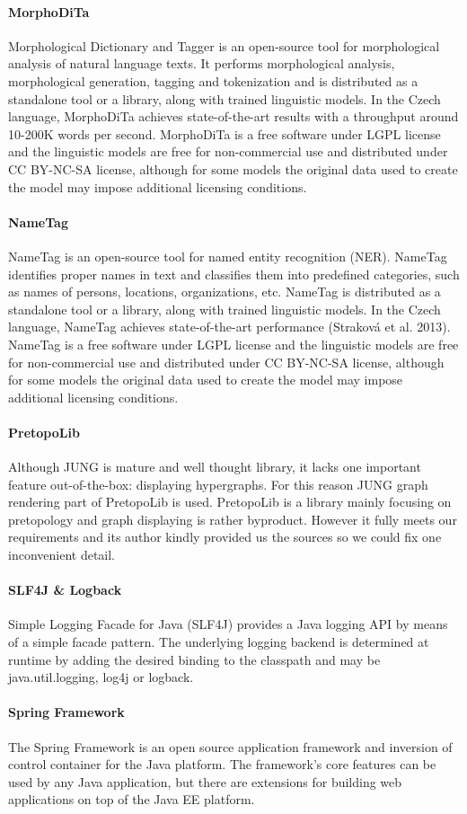 \paragraph{MorphoDiTa}
Morphological Dictionary and Tagger is an open-source tool for morphological
analysis of natural language texts. It performs morphological analysis, 
morphological generation, tagging and tokenization and is distributed as
a standalone tool or a library, along with trained linguistic models. In
the Czech language, MorphoDiTa achieves state-of-the-art results with 
a throughput around 10-200K words per second. MorphoDiTa is a free software
under LGPL license and the linguistic models are free for non-commercial use
and distributed under CC BY-NC-SA license, although for some models the original
data used to create the model may impose additional licensing conditions.

\paragraph{NameTag}
NameTag is an open-source tool for named entity recognition (NER). NameTag 
identifies proper names in text and classifies them into predefined categories,
such as names of persons, locations, organizations, etc. NameTag is distributed
as a standalone tool or a library, along with trained linguistic models.
In the Czech language, NameTag achieves state-of-the-art performance
(Straková et al. 2013). NameTag is a free software under LGPL license and the 
linguistic models are free for non-commercial use and distributed under CC 
BY-NC-SA license, although for some models the original data used to create
the model may impose additional licensing conditions.

\paragraph{PretopoLib}
Although JUNG is mature and well thought library, it lacks one important feature
out-of-the-box: displaying hypergraphs. For this reason JUNG graph rendering
part of PretopoLib is used. PretopoLib is a library mainly focusing on
pretopology and graph displaying is rather byproduct. However it fully meets our
requirements and its author kindly provided us the sources so we could fix one
inconvenient detail.

\paragraph{SLF4J \& Logback}
Simple Logging Facade for Java (SLF4J) provides a Java logging API by means
of a simple facade pattern. The underlying logging backend is determined
at runtime by adding the desired binding to the classpath and may be
java.util.logging, log4j or logback.

\paragraph{Spring Framework}
The Spring Framework is an open source application framework and inversion
of control container for the Java platform. The framework's core features
can be used by any Java application, but there are extensions for building
web applications on top of the Java EE platform.
